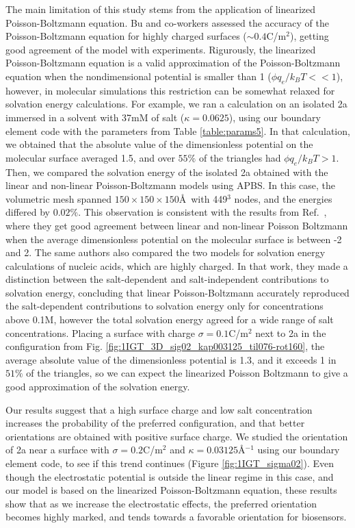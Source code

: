 The main limitation of this study stems from the application of linearized Poisson-Boltzmann equation.
Bu and co-workers\cite{BuVakninTravesset2006} assessed the accuracy of the Poisson-Boltzmann equation for highly charged surfaces ($\sim 0.4$C/m$^2$), getting good agreement of the model with experiments. 
Rigurously, the linearized Poisson-Boltzmann equation is a valid approximation of the Poisson-Boltzmann equation when the nondimensional potential is smaller than 1 ($\phi q_e/k_BT<<1$), however, in molecular simulations this restriction can be somewhat relaxed for solvation energy calculations. 
For example, we ran a calculation on an isolated \ig 2a immersed in a solvent with 37mM of salt ($\kappa = 0.0625$), using our boundary element code with the parameters from Table \ref{table:params5}. 
In that calculation, we obtained that the absolute value of the dimensionless potential on the molecular surface averaged 1.5, and over $55\%$ of the triangles had $\phi q_e/k_BT>1$.
Then, we compared the solvation energy of the isolated \ig 2a obtained with the linear and non-linear Poisson-Boltzmann models using APBS.\cite{BakerETal2001} In this case, the volumetric mesh spanned $150\times 150\times 150$\AA\ with 449$^3$ nodes, and the energies differed by $0.02\%$.
This observation is consistent with the results from Ref.~, where they get good agreement between linear and non-linear Poisson Boltzmann when the average dimensionless potential on the molecular surface is between -2 and 2. The same authors also compared the two models for solvation energy calculations of nucleic acids, which are highly charged.\cite{FogolariETal2015} In that work, they made a distinction between the salt-dependent and salt-independent contributions to solvation energy, concluding that linear Poisson-Boltzmann accurately reproduced the salt-dependent contributions to solvation energy only for concentrations above 0.1M, however the total solvation energy agreed for a wide range of salt concentrations. 
Placing a surface with charge $\sigma=0.1$C/m$^2$ next to \ig 2a in the configuration from Fig. \ref{fig:1IGT_3D_sig02_kap003125_til076-rot160}, the average absolute value of the dimensionless potential is 1.3, and it exceeds 1 in $51\%$ of the triangles, so we can expect the linearized Poisson Boltzmann to give a good approximation of the solvation energy.

Our results suggest that a high surface charge and low salt concentration increases the probability of the preferred configuration, and that better orientations are obtained with positive surface charge.
We studied the orientation of \ig 2a near a surface with $\sigma =0.2$C/m${^2}$ and $\kappa=0.03125$\AA$^{-1}$ using our boundary element code, to see if this trend continues (Figure \ref{fig:1IGT_sigma02}). 
Even though the electrostatic potential is outside the linear regime in this case, and our model is based on the linearized Poisson-Boltzmann equation, these results show that as we increase the electrostatic effects, the preferred orientation becomes highly marked, and tends towards a favorable orientation for biosensors.

